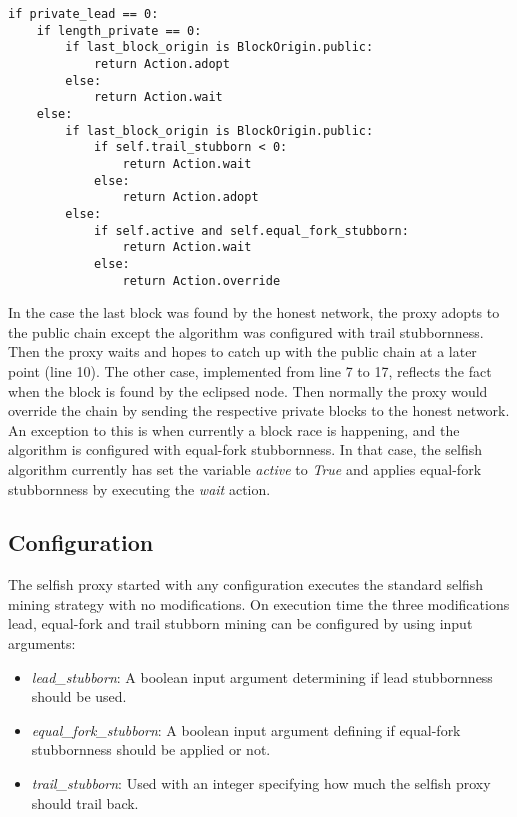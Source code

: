 \begin{minipage}{\linewidth}
\begin{lstlisting}[caption=Part of the selfish mining algorithm where private lead is zero, label={lst:algo}, basicstyle=\ttfamily, captionpos=b]
if private_lead == 0:
    if length_private == 0:
        if last_block_origin is BlockOrigin.public:
            return Action.adopt
        else:
            return Action.wait
    else:
        if last_block_origin is BlockOrigin.public:
            if self.trail_stubborn < 0:
                return Action.wait
            else:
                return Action.adopt
        else:
            if self.active and self.equal_fork_stubborn:
                return Action.wait
            else:
                return Action.override
\end{lstlisting}
\end{minipage}

In the case the last block was found by the honest network, the proxy adopts to the public chain except the algorithm was configured with trail stubbornness.
Then the proxy waits and hopes to catch up with the public chain at a later point (line 10).
The other case, implemented from line 7 to 17, reflects the fact when the block is found by the eclipsed node.
Then normally the proxy would override the chain by sending the respective private blocks to the honest network.
An exception to this is when currently a block race is happening, and the algorithm is configured with equal-fork stubbornness.
In that case, the selfish algorithm currently has set the variable \textit{active} to \textit{True} and applies equal-fork stubbornness by executing the \textit{wait} action.

\subsection{Configuration}

The selfish proxy started with any configuration executes the standard selfish mining strategy with no modifications.
On execution time the three modifications lead, equal-fork and trail stubborn mining can be configured by using input arguments:

\begin{itemize}
	\item \textit{lead\_stubborn}:
	A boolean input argument determining if lead stubbornness should be used. 
	\item \textit{equal\_fork\_stubborn}:
	A boolean input argument defining if equal-fork stubbornness should be applied or not.
	\item \textit{trail\_stubborn}:
	Used with an integer specifying how much the selfish proxy should trail back.
\end{itemize}
